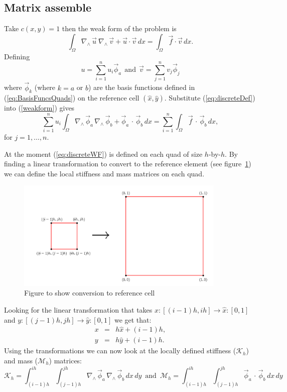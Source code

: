 \documentclass[14pt]{extarticle}
\numberwithin{equation}{section}    %
\newcommand{\curl}{\ensuremath{\nabla_{\wedge}\,}}
\renewcommand{\u}{\vec u}
\newcommand{\f}{\vec f}
\renewcommand{\v}{\vec v}
\newcommand{\phiv}{\vec \phi}
\begin{document}
\subsection{Matrix assemble}


Take $c(x,y) = 1$ then the weak form of the problem is
$$ \int_\Omega \curl \u \ \curl \v + \u \cdot \v\, dx = \int_\Omega \f \cdot \v \, dx.$$
Defining
\begin{equation} \label{eq:discreteDef}
u = \sum_{i=1}^n u_i \phiv_a \ \ \mbox{and} \ \ \v = \sum_{j=1}^n v_j \phiv_j
\end{equation}
where $\phiv_{k}$ (where $k = a$ or $b$) are the basis functions defined in (\ref{eq:BasisFuncsQuads}) on the reference cell $(\hat x,\hat y)$. Substitute (\ref{eq:discreteDef}) into (\ref{weakform}) gives
\begin{equation} \label{eq:discreteWF}
    \sum^n_{i=1} u_i \int_\Omega \curl \phiv_a \, \curl \phiv_b+\phiv_a  \, {\cdot} \, \phiv_b\, dx = \sum^n_{i=1}\int_\Omega \f \, \cdot \, \phiv_b\, dx,
\end{equation}
for $j = 1,\ldots,n$.

At the moment (\ref{eq:discreteWF}) is defined on each quad of size $h$-by-$h$. By finding a linear transformation to convert to the reference element (see figure~\ref{fig:refcell}) we can define the local stiffness and mass matrices on each quad.
\begin{figure}[h!]
\centering
\includegraphics[width=10cm]{GridFigure/hCellTorefCell}
\caption{Figure to show conversion to reference cell}
\label{fig:refcell}
\end{figure}
Looking for the linear transformation that takes $x:[(i-1)h,ih] \rightarrow \hat x:[0,1]$ and $y:[(j-1)h,jh] \rightarrow \hat y:[0,1]$ we get that:
\begin{eqnarray*}
    x &=& h \hat x +(i-1)h,\\
    y &=& h \hat y +(i-1)h.
\end{eqnarray*}
Using the transformations we can now look at the locally defined stiffness ($\mathcal{K}_h$) and mass ($\mathcal{M}_h$) matrices:
$$ \mathcal{K}_h =  \int_{(i-1)h}^{ih}\int_{(j-1)h}^{jh} \curl \phiv_a \, \curl \phiv_b \, dx \, dy \, \mbox{ and } \, \mathcal{M}_h =   \int_{(i-1)h}^{ih}\int_{(j-1)h}^{jh} \phiv_a  \, {\cdot} \, \phiv_b\, dx \, dy$$
\end{document}
